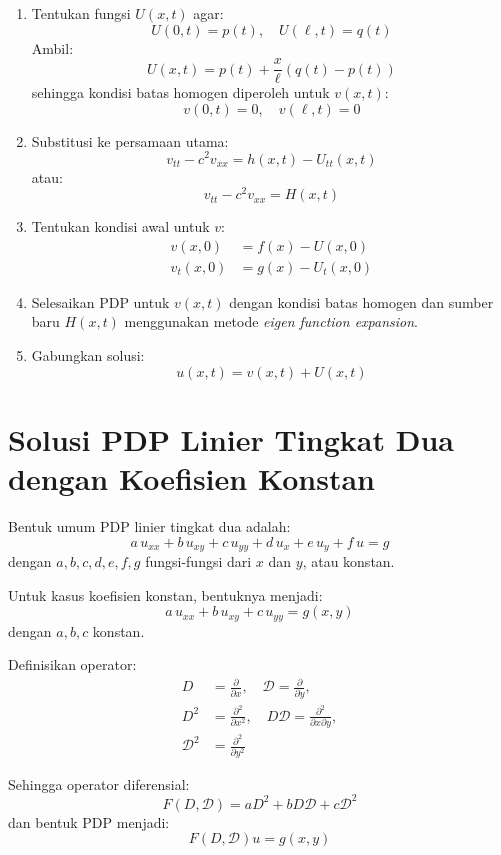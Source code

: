 \documentclass[a4paper,extrafontsizes, 9pt]{memoir}
\begin{document}
\begin{multicols}{3}
\begin{enumerate}
    \item Tentukan fungsi $U(x,t)$ agar:
    \[
    U(0,t) = p(t), \quad U(\ell,t) = q(t)
    \]
    Ambil:
    \[
    U(x,t) = p(t) + \frac{x}{\ell} \left(q(t) - p(t)\right)
    \]
    sehingga kondisi batas homogen diperoleh untuk $v(x,t)$:
    \[
    v(0,t) = 0, \quad v(\ell,t) = 0
    \]
    
    \item Substitusi ke persamaan utama:
    \[
    v_{tt} - c^2 v_{xx} = h(x,t) - U_{tt}(x,t)
    \]
    atau:
    \[
    v_{tt} - c^2 v_{xx} = H(x,t)
    \]
    
    \item Tentukan kondisi awal untuk $v$:
    \begin{align*}
        v(x,0) &= f(x) - U(x,0) \\
        v_t(x,0) &= g(x) - U_t(x,0)
    \end{align*}
    
    \item Selesaikan PDP untuk $v(x,t)$ dengan kondisi batas homogen dan sumber baru $H(x,t)$ menggunakan metode \textit{eigen function expansion}.
    
    \item Gabungkan solusi:
    \[
    u(x,t) = v(x,t) + U(x,t)
    \]
\end{enumerate}
\section*{\small Solusi PDP Linier Tingkat Dua dengan Koefisien Konstan}

Bentuk umum PDP linier tingkat dua adalah:
\[
a\,u_{xx} + b\,u_{xy} + c\,u_{yy} + d\,u_x + e\,u_y + f\,u = g
\]
dengan \( a, b, c, d, e, f, g \) fungsi-fungsi dari \( x \) dan \( y \), atau konstan.

Untuk kasus koefisien konstan, bentuknya menjadi:
\[
a\,u_{xx} + b\,u_{xy} + c\,u_{yy} = g(x, y)
\]
dengan \( a, b, c \) konstan.

Definisikan operator:
\begin{align*}
    D &= \frac{\partial}{\partial x}, \quad \mathcal{D} = \frac{\partial}{\partial y},\\
    D^2 &= \frac{\partial^2}{\partial x^2}, \quad D\mathcal{D} = \frac{\partial^2}{\partial x \partial y},\\
    \mathcal{D}^2 &= \frac{\partial^2}{\partial y^2}
\end{align*}

Sehingga operator diferensial:
\[
F(D, \mathcal{D}) = a D^2 + b D \mathcal{D} + c \mathcal{D}^2
\]
dan bentuk PDP menjadi:
\[
F(D, \mathcal{D}) u = g(x, y)
\]


\end{multicols}
\end{document}
